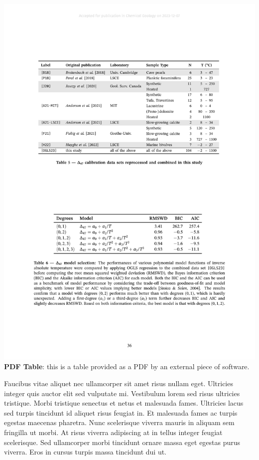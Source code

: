 \begin{table}[b!]
\center
\includegraphics[]{input/table-pdf}\\
\caption{
\textbf{PDF Table}: this is a table provided as a PDF by an external
piece of software.
}
\label{tab:pdf}
\end{table}

Faucibus vitae aliquet nec ullamcorper sit amet risus nullam eget.
Ultricies integer quis auctor elit sed vulputate mi. Vestibulum lorem
sed risus ultricies tristique. Morbi tristique senectus et netus et
malesuada fames. Ultricies lacus sed turpis tincidunt id aliquet risus
feugiat in. Et malesuada fames ac turpis egestas maecenas pharetra. Nunc
scelerisque viverra mauris in aliquam sem fringilla ut morbi. At risus
viverra adipiscing at in tellus integer feugiat scelerisque. Sed
ullamcorper morbi tincidunt ornare massa eget egestas purus viverra.
Eros in cursus turpis massa tincidunt dui ut.

